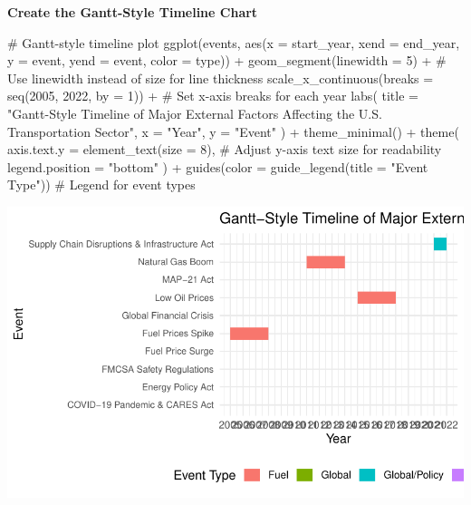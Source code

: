 \documentclass[
  letterpaper,
  DIV=11,
  numbers=noendperiod]{scrreprt}
\newenvironment{Shaded}{\begin{snugshade}}{\end{snugshade}}
\newcommand{\AttributeTok}[1]{\textcolor[rgb]{0.40,0.45,0.13}{#1}}
\newcommand{\CommentTok}[1]{\textcolor[rgb]{0.37,0.37,0.37}{#1}}
\newcommand{\DecValTok}[1]{\textcolor[rgb]{0.68,0.00,0.00}{#1}}
\newcommand{\FunctionTok}[1]{\textcolor[rgb]{0.28,0.35,0.67}{#1}}
\newcommand{\NormalTok}[1]{\textcolor[rgb]{0.00,0.23,0.31}{#1}}
\newcommand{\SpecialCharTok}[1]{\textcolor[rgb]{0.37,0.37,0.37}{#1}}
\newcommand{\StringTok}[1]{\textcolor[rgb]{0.13,0.47,0.30}{#1}}
\begin{document}
\textbf{Create the Gantt-Style Timeline Chart}

\begin{Shaded}
\begin{Highlighting}[]
\CommentTok{\# Gantt{-}style timeline plot}
\FunctionTok{ggplot}\NormalTok{(events, }\FunctionTok{aes}\NormalTok{(}\AttributeTok{x =}\NormalTok{ start\_year, }\AttributeTok{xend =}\NormalTok{ end\_year, }\AttributeTok{y =}\NormalTok{ event, }\AttributeTok{yend =}\NormalTok{ event, }\AttributeTok{color =}\NormalTok{ type)) }\SpecialCharTok{+}
  \FunctionTok{geom\_segment}\NormalTok{(}\AttributeTok{linewidth =} \DecValTok{5}\NormalTok{) }\SpecialCharTok{+}  \CommentTok{\# Use linewidth instead of size for line thickness}
  \FunctionTok{scale\_x\_continuous}\NormalTok{(}\AttributeTok{breaks =} \FunctionTok{seq}\NormalTok{(}\DecValTok{2005}\NormalTok{, }\DecValTok{2022}\NormalTok{, }\AttributeTok{by =} \DecValTok{1}\NormalTok{)) }\SpecialCharTok{+}  \CommentTok{\# Set x{-}axis breaks for each year}
  \FunctionTok{labs}\NormalTok{(}
    \AttributeTok{title =} \StringTok{"Gantt{-}Style Timeline of Major External Factors Affecting the U.S. Transportation Sector"}\NormalTok{,}
    \AttributeTok{x =} \StringTok{"Year"}\NormalTok{,}
    \AttributeTok{y =} \StringTok{"Event"}
\NormalTok{  ) }\SpecialCharTok{+}
  \FunctionTok{theme\_minimal}\NormalTok{() }\SpecialCharTok{+}
  \FunctionTok{theme}\NormalTok{(}
    \AttributeTok{axis.text.y =} \FunctionTok{element\_text}\NormalTok{(}\AttributeTok{size =} \DecValTok{8}\NormalTok{),  }\CommentTok{\# Adjust y{-}axis text size for readability}
    \AttributeTok{legend.position =} \StringTok{"bottom"}
\NormalTok{  ) }\SpecialCharTok{+}
  \FunctionTok{guides}\NormalTok{(}\AttributeTok{color =} \FunctionTok{guide\_legend}\NormalTok{(}\AttributeTok{title =} \StringTok{"Event Type"}\NormalTok{))  }\CommentTok{\# Legend for event types}
\end{Highlighting}
\end{Shaded}

\includegraphics{FinalProject_Toluwanimi_files/figure-pdf/unnamed-chunk-7-1.pdf}
\end{document}
